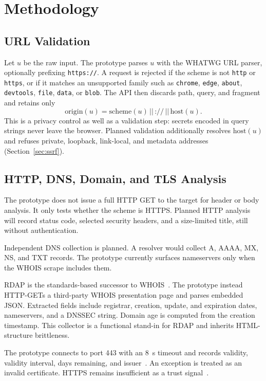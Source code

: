 \documentclass[conference]{IEEEtran}
\begin{document}
\section{Methodology}
\label{sec:method}

\subsection{URL Validation}
\label{sec:urlval}
Let $u$ be the raw input. The prototype parses $u$ with the WHATWG URL parser, optionally prefixing \texttt{https://}. A request is rejected if the scheme is not \texttt{http} or \texttt{https}, or if it matches an unsupported family such as \texttt{chrome}, \texttt{edge}, \texttt{about}, \texttt{devtools}, \texttt{file}, \texttt{data}, or \texttt{blob}. The API then discards path, query, and fragment and retains only
\begin{equation}
\mathrm{origin}(u)=\mathrm{scheme}(u)\,||\,\texttt{://}\,||\,\mathrm{host}(u).
\label{eq:origin}
\end{equation}
This is a privacy control as well as a validation step: secrets encoded in query strings never leave the browser. Planned validation additionally resolves $\mathrm{host}(u)$ and refuses private, loopback, link-local, and metadata addresses (Section~\ref{sec:ssrf}).

\subsection{HTTP, DNS, Domain, and TLS Analysis}
The prototype does not issue a full HTTP GET to the target for header or body analysis. It only tests whether the scheme is HTTPS. Planned HTTP analysis will record status code, selected security headers, and a size-limited title, still without authentication.

Independent DNS collection is planned. A resolver would collect A, AAAA, MX, NS, and TXT records. The prototype currently surfaces nameservers only when the WHOIS scrape includes them.

RDAP is the standards-based successor to WHOIS~\cite{rfc7480}. The prototype instead HTTP-GETs a third-party WHOIS presentation page and parses embedded JSON. Extracted fields include registrar, creation, update, and expiration dates, nameservers, and a DNSSEC string. Domain age is computed from the creation timestamp. This collector is a functional stand-in for RDAP and inherits HTML-structure brittleness.

The prototype connects to port 443 with an 8~s timeout and records validity, validity interval, days remaining, and issuer~\cite{rfc8446}. An exception is treated as an invalid certificate. HTTPS remains insufficient as a trust signal~\cite{dhamija2006why,apwg2024q4}.
\end{document}
